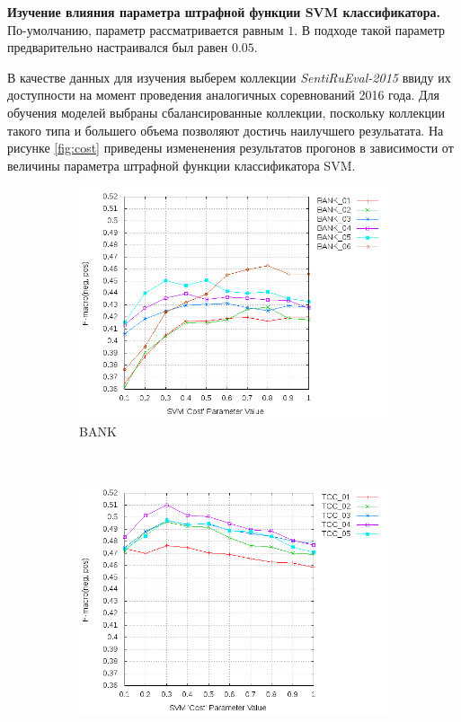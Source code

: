 {\bf Изучение влияния параметра штрафной функции SVM классификатора.}
По-умолчанию, параметр рассматривается равным $1$. В подходе \cite{modernApproach}
такой параметр предварительно настраивался был равен $0.05$.

В качестве данных для изучения выберем коллекции {\it SentiRuEval-2015} ввиду их
доступности на момент проведения аналогичных соревнований 2016 года. Для
обучения моделей выбраны сбалансированные коллекции, поскольку коллекции такого
типа и большего объема позволяют достичь наилучшего резульатата. На рисунке
\ref{fig:cost} приведены измененения результатов прогонов в зависимости от
величины параметра штрафной функции классификатора SVM.

\begin{figure}[!htp] \centering
    \captionsetup[subfigure]{justification=centering}
    \begin{subfigure}[b]{0.45\textwidth}
        \includegraphics[width=\textwidth]{pics/2015_bank_balanced.png}
        \caption{BANK}
        \label{fig:bank_cost_changes}
    \end{subfigure}
    ~
    \begin{subfigure}[b]{0.45\textwidth}
        \includegraphics[width=\textwidth]{pics/2015_ttk_balanced.png}

\end{subfigure}
\end{figure}
